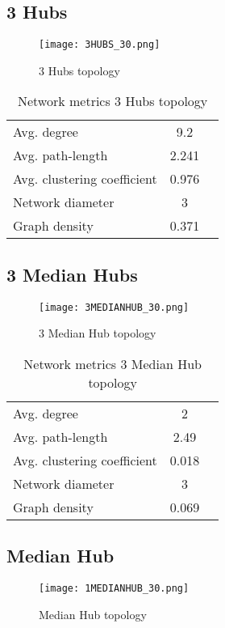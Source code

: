\documentclass[Bachelorarbeit.tex]{subfiles}
\begin{document}
\subsection{3 Hubs}
\begin{figure}[H]
	\centering
  \texttt{[image: 3HUBS\_30.png]}
	\caption{3 Hubs topology}
	\label{fig1}
\end{figure}

\begin{table}[h]
	\centering
	\caption{Network metrics 3 Hubs topology}
	\begin{tabular} { l c r }
		\hline
		Avg. degree & 9.2 \\
		Avg. path-length & 2.241 \\
		Avg. clustering coefficient & 0.976 \\
		Network diameter & 3 \\
		Graph density & 0.371\\
		\hline
	\end{tabular}
\end{table}

\subsection{3 Median Hubs}
\begin{figure}[H]
	\centering
  \texttt{[image: 3MEDIANHUB\_30.png]}
	\caption{3 Median Hub topology}
	\label{fig1}
\end{figure}

\begin{table}[h]
	\centering
	\caption{Network metrics 3 Median Hub topology}
	\begin{tabular} { l c r }
		\hline
		Avg. degree & 2 \\
		Avg. path-length & 2.49 \\
		Avg. clustering coefficient & 0.018 \\
		Network diameter & 3 \\
		Graph density & 0.069 \\
		\hline
	\end{tabular}
\end{table}

\subsection{Median Hub}
\begin{figure}[H]
	\centering
  \texttt{[image: 1MEDIANHUB\_30.png]}
	\caption{Median Hub topology}
	\label{fig1}
\end{figure}
\end{document}
